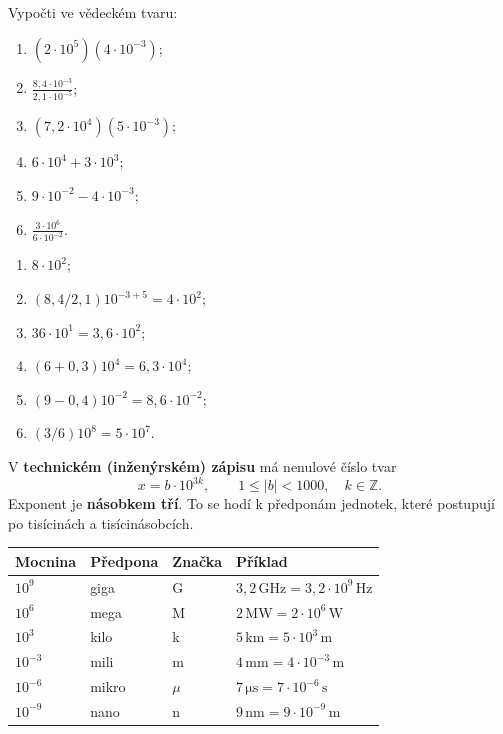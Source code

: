 \documentclass[11pt,a4paper]{article}
\begin{document}
\begin{zadaniReseniBox}[breakable=false,title={Samostatná práce 3: výpočty a řád výsledku}]
Vypočti ve vědeckém tvaru:
\begin{enumerate}[label=\alph*)]
\item $(2\cdot10^5)(4\cdot10^{-3})$;
\item $\displaystyle\frac{8{,}4\cdot10^{-3}}{2{,}1\cdot10^{-5}}$;
\item $(7{,}2\cdot10^4)(5\cdot10^{-3})$;
\item $6\cdot10^4+3\cdot10^3$;
\item $9\cdot10^{-2}-4\cdot10^{-3}$;
\item $\displaystyle\frac{3\cdot10^6}{6\cdot10^{-2}}$.
\end{enumerate}
\tcblower
\begin{enumerate}[label=\alph*)]
\item $8\cdot10^2$;
\item $(8{,}4/2{,}1)10^{-3+5}=4\cdot10^2$;
\item $36\cdot10^1=3{,}6\cdot10^2$;
\item $(6+0{,}3)10^4=6{,}3\cdot10^4$;
\item $(9-0{,}4)10^{-2}=8{,}6\cdot10^{-2}$;
\item $(3/6)10^8=5\cdot10^7$.
\end{enumerate}
\end{zadaniReseniBox}

\begin{definiceBox}[title={Definice: technický zápis}]
V \textbf{technickém (inženýrském) zápisu} má nenulové číslo tvar
\[
\boxed{x=b\cdot10^{3k},\qquad1\le|b|<1000,\quad k\in\mathbb Z.}
\]
Exponent je \textbf{násobkem tří}. To se hodí k předponám
jednotek, které postupují po tisícinách a tisícinásobcích.
\end{definiceBox}
\begin{center}\small
\begin{tabularx}{\linewidth}{@{}>{\raggedright\arraybackslash}p{19mm}>{\raggedright\arraybackslash}p{18mm}>{\raggedright\arraybackslash}p{23mm}X@{}}
\toprule
Mocnina & Předpona & Značka & Příklad\\\midrule
$10^9$ & giga & G & $3{,}2\,\mathrm{GHz}=3{,}2\cdot10^9\,\mathrm{Hz}$\\
$10^6$ & mega & M & $2\,\mathrm{MW}=2\cdot10^6\,\mathrm W$\\
$10^3$ & kilo & k & $5\,\mathrm{km}=5\cdot10^3\,\mathrm m$\\
$10^{-3}$ & mili & m & $4\,\mathrm{mm}=4\cdot10^{-3}\,\mathrm m$\\
$10^{-6}$ & mikro & $\mu$ & $7\,\mathrm{\mu s}=7\cdot10^{-6}\,\mathrm s$\\
$10^{-9}$ & nano & n & $9\,\mathrm{nm}=9\cdot10^{-9}\,\mathrm m$\\
\bottomrule
\end{tabularx}
\end{center}
\end{document}

